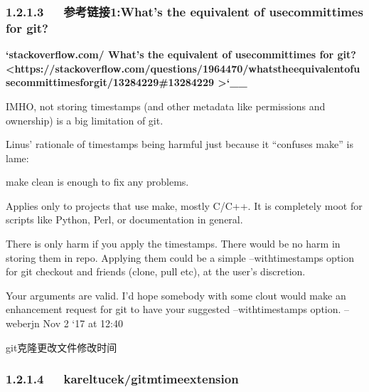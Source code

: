 \documentclass[letterpaper,12pt,english]{sphinxmanual}
\begin{document}
\subsubsection{1.2.1.3   参考链接1:What’s the equivalent of use\sphinxhyphen{}commit\sphinxhyphen{}times for git?}
\label{\detokenize{001software/001install/001._u7f51_u7ad9/github:what-s-the-equivalent-of-use-commit-times-for-git}}
{\color{red}\bfseries{}`stackoverflow.com/ What's the equivalent of use\sphinxhyphen{}commit\sphinxhyphen{}times for git? <https://stackoverflow.com/questions/1964470/whats\sphinxhyphen{}the\sphinxhyphen{}equivalent\sphinxhyphen{}of\sphinxhyphen{}use\sphinxhyphen{}commit\sphinxhyphen{}times\sphinxhyphen{}for\sphinxhyphen{}git/13284229\#13284229
>`\_\_}

IMHO, not storing timestamps (and other metadata like permissions and ownership) is a big limitation of git.

Linus’ rationale of timestamps being harmful just because it “confuses make” is lame:

make clean is enough to fix any problems.

Applies only to projects that use make, mostly C/C++. It is completely moot for scripts like Python, Perl, or documentation in general.

There is only harm if you apply the timestamps. There would be no harm in storing them in repo. Applying them could be a simple –with\sphinxhyphen{}timestamps option for git checkout and friends (clone, pull etc), at the user’s discretion.

Your arguments are valid. I’d hope somebody with some clout would make an enhancement request for git to have your suggested –with\sphinxhyphen{}timestamps option. – weberjn Nov 2 ‘17 at 12:40

git克隆更改文件修改时间



\subsubsection{1.2.1.4   kareltucek/git\sphinxhyphen{}mtime\sphinxhyphen{}extension}
\label{\detokenize{001software/001install/001._u7f51_u7ad9/github:kareltucek-git-mtime-extension}}
\end{document}
